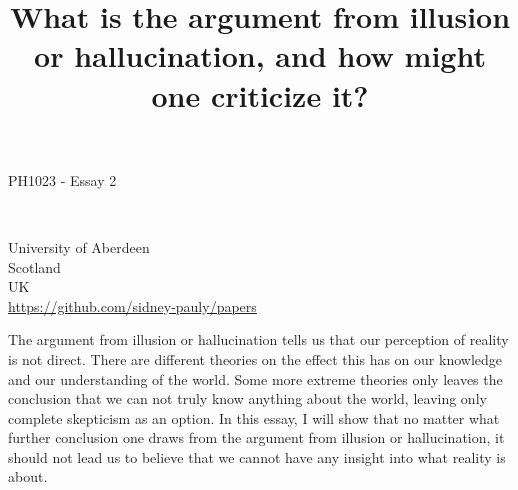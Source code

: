 \documentclass[fleqn,14pt]{article}
\begin{document}
\lstset{
  language=Python,
  basicstyle=\small,          %
  keywordstyle=\bfseries,
  identifierstyle=,           %
  commentstyle=,              %
  stringstyle=\ttfamily,      %
  showstringspaces=false,     %
  numbers=left,
  numberstyle=\tiny,
  numbersep=5pt,
  frame=tb,
}

\title{What is the argument from illusion or hallucination, and how might one criticize it?}
\date{}




\fancyhf{}



\begin{titlepage}
  \begin{center}
    \Large
    \textbf{\thetitle}
        
    \vspace{0.4cm}
    \large
    PH1023 - Essay 2
        
    \vspace{0.4cm}
    \textbf{\theauthor}\\
    \textbf{\theuoastudentid}

       
    \vfill


    University of Aberdeen\\
    Scotland\\
    UK\\
    \thedate
    \vspace{0.4cm}
    \url{https://github.com/sidney-pauly/papers}
  \end{center}
\end{titlepage}



The argument from illusion or hallucination tells us that our perception of reality is not direct. There are
different theories on the effect this has on our knowledge and our understanding of the world. Some more extreme theories
only leaves the conclusion that we can not truly know anything about the world, leaving only complete
skepticism as an option. In this essay, I will show that no matter what further conclusion one draws from the
argument from illusion or hallucination, it should not lead us to believe that we cannot have any insight
into what reality is about.\\
\end{document}
